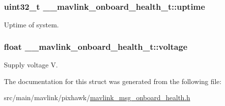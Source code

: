 \hypertarget{struct____mavlink__onboard__health__t_a647c8af29eb0b411c45f6ca364c0f787}{
\subsubsection[{uptime}]{\setlength{\rightskip}{0pt plus 5cm}uint32\+\_\+t \+\_\+\+\_\+mavlink\+\_\+onboard\+\_\+health\+\_\+t\+::uptime}}\label{struct____mavlink__onboard__health__t_a647c8af29eb0b411c45f6ca364c0f787}


Uptime of system. 

\hypertarget{struct____mavlink__onboard__health__t_a63f5df641cd3ed8be2383ef20a722839}{
\subsubsection[{voltage}]{\setlength{\rightskip}{0pt plus 5cm}float \+\_\+\+\_\+mavlink\+\_\+onboard\+\_\+health\+\_\+t\+::voltage}}\label{struct____mavlink__onboard__health__t_a63f5df641cd3ed8be2383ef20a722839}


Supply voltage V. 



The documentation for this struct was generated from the following file\+:\begin{DoxyCompactItemize}
\item 
src/main/mavlink/pixhawk/\hyperlink{mavlink__msg__onboard__health_8h}{mavlink\+\_\+msg\+\_\+onboard\+\_\+health.\+h}\end{DoxyCompactItemize}
